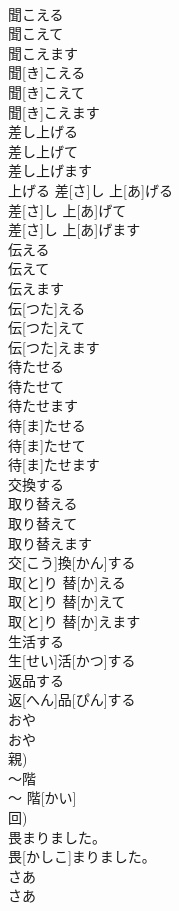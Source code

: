 \documentclass[8pt]{extreport}
\begin{document}
\begin{CJK}{UTF8}{min}
\\	聞こえる 
\\	聞こえて 
\\	聞こえます	
\\	聞[き]こえる 
\\	聞[き]こえて 
\\	聞[き]こえます	
\\	差し上げる 
\\	差し上げて 
\\	差し上げます	
\\	上げる	差[さ]し 上[あ]げる 
\\	差[さ]し 上[あ]げて 
\\	差[さ]し 上[あ]げます	
\\	伝える 
\\	伝えて 
\\	伝えます	
\\	伝[つた]える 
\\	伝[つた]えて 
\\	伝[つた]えます	
\\	待たせる 
\\	待たせて 
\\	待たせます	
\\	待[ま]たせる 
\\	待[ま]たせて 
\\	待[ま]たせます	
\\	交換する 
\\	取り替える 
\\	取り替えて 
\\	取り替えます	
\\	交[こう]換[かん]する 
\\	取[と]り 替[か]える 
\\	取[と]り 替[か]えて 
\\	取[と]り 替[か]えます	
\\	生活する	
\\	生[せい]活[かつ]する	
\\	返品する	
\\	返[へん]品[ぴん]する	
\\	おや	
\\	おや 
\\	親)	
\\	〜階	
\\	〜 階[かい] 
\\	回)	
\\	畏まりました。	
\\	畏[かしこ]まりました。	
\\	さあ	
\\	さあ	

\end{CJK}
\end{document}
